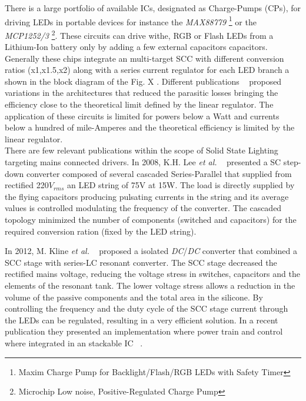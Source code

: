There is a large portfolio of available ICs, designated as Charge-Pumps (CPs), for driving LEDs in portable devices  for instance  the \emph{MAX88779} \footnote{Maxim\textsuperscript{\textregistered} Charge Pump for Backlight/Flash/RGB LEDs with Safety Timer } or the \emph{MCP1252/3} \footnote{Microchip\textsuperscript{\textregistered} Low noise, Positive-Regulated Charge Pump}. These circuits  can drive withe, RGB or Flash LEDs from a Lithium-Ion battery only by adding a few external capacitors capacitors.  Generally these chips integrate an multi-target SCC with different conversion ratios (x1,x1.5,x2) along with a series current regulator for each LED branch a shown in the block diagram of the Fig. X . Different publications ~\cite{07Feng,09Wu,10Yin} proposed variations in the architectures that reduced the parasitic losses bringing the efficiency close to the theoretical limit defined by the linear regulator. The application of these circuits is limited for powers below a Watt and currents below a hundred of mile-Amperes and the theoretical efficiency is limited by the linear regulator.\\


There are few relevant publications within the scope of Solid State Lighting targeting mains connected drivers. In 2008, K.H. Lee \emph{et al.} ~\cite{08Lee} presented a SC step-down converter composed of several cascaded Series-Parallel that supplied from rectified 220$V_{rms}$ an LED string of 75V at 15W. The load is directly supplied by the flying capacitors producing pulsating currents in the string and its average values is controlled modulating the frequency of the converter. The cascaded topology minimized the number of components (switched and capacitors) for the required conversion ration (fixed by the LED string).

In 2012, M. Kline \emph{et al.} ~\cite{12Kline} proposed a isolated \emph{DC}/\emph{DC} converter that combined a SCC stage with series-LC resonant converter.  The SCC stage decreased  the rectified mains voltage, reducing the voltage stress in switches, capacitors and the elements of the resonant tank. The lower voltage stress allows a reduction in the volume of the passive components and the total area in the silicone. By controlling the frequency and the duty cycle of the SCC stage current through the LEDs can be regulated, resulting in a very efficient solution. In a recent publication they presented an implementation where power train and control where integrated in an stackable IC ~\cite{13Kline}.  \\

